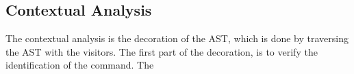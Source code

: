 \subsection{Contextual Analysis}
\label{sec:ai_contextual_analysis}
The contextual analysis is the decoration of the AST, which is done by traversing the AST with the visitors. 
The first part of the decoration, is to verify the identification of the command.
The 